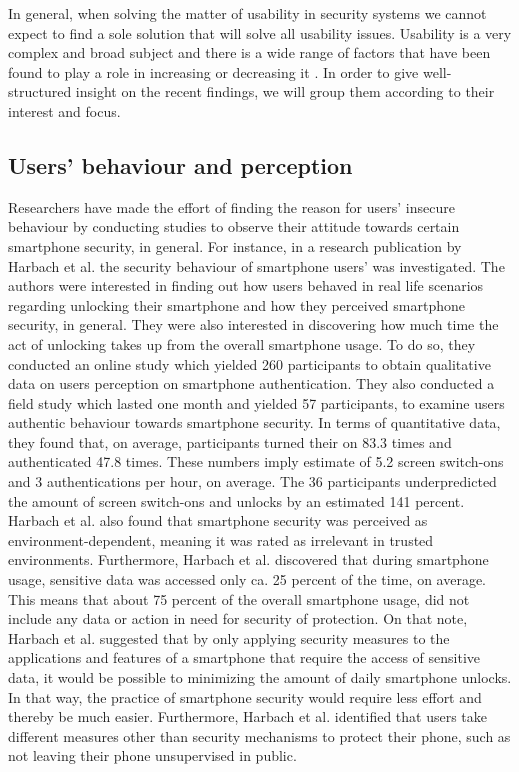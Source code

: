 In general, when solving the matter of usability in security systems we cannot expect to find a sole solution that will solve all usability issues. Usability is a very complex and broad subject and there is a wide range of factors that have been found to play a role in increasing or decreasing it \cite{anonymous,harbach,Albayram:2017:BUL:3235924.3235929, AnatomySmartphone}. In order to give well-structured insight on the recent findings, we will group them according to their interest and focus. 

\subsection{Users' behaviour and perception}

Researchers have made the effort of finding the reason for users' insecure behaviour by conducting studies to observe their attitude towards certain smartphone security, in general. For instance, in a research publication by Harbach et al. \cite{harbach} the security behaviour of smartphone users' was investigated. The authors were interested in finding out how users behaved in real life scenarios regarding unlocking their smartphone and how they perceived smartphone security, in general. They were also interested in discovering how much time the act of unlocking takes up from the overall smartphone usage. To do so, they conducted an online study which yielded 260 participants to obtain qualitative data on users perception on smartphone authentication. They also conducted a field study which lasted one month and yielded 57 participants, to examine users authentic behaviour towards smartphone security. In terms of quantitative data, they found that, on average, participants turned their on 83.3 times and authenticated 47.8 times. These numbers imply estimate of 5.2 screen switch-ons and 3 authentications per hour, on average. The 36 participants underpredicted the amount of screen switch-ons and unlocks by an estimated 141 percent. Harbach et al. \cite{harbach} also found that smartphone security was perceived as environment-dependent, meaning it was rated as irrelevant in trusted environments. Furthermore, Harbach et al. \cite{harbach} discovered that during smartphone usage, sensitive data was accessed only ca. 25 percent of the time, on average. This means that about 75 percent of the overall smartphone usage, did not include any data or action in need for security of protection. On that note, Harbach et al. suggested that by only applying security measures to the applications and features of a smartphone that require the access of sensitive data, it would be possible to minimizing the amount of daily smartphone unlocks. In that way, the practice of smartphone security would require less effort and thereby be much easier. Furthermore, Harbach et al. identified that users take different measures other than security mechanisms to protect their phone, such as not leaving their phone unsupervised in public. 

